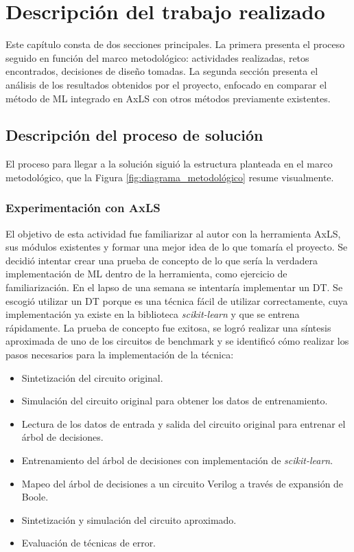 \chapter{Descripción del trabajo realizado}

Este capítulo consta de dos secciones principales. La primera presenta el
proceso seguido en función del marco metodológico: actividades realizadas,
retos encontrados, decisiones de diseño tomadas. La segunda sección presenta el
análisis de los resultados obtenidos por el proyecto, enfocado en comparar el
método de ML integrado en AxLS con otros métodos previamente existentes.

\section{Descripción del proceso de solución}

El proceso para llegar a la solución siguió la estructura planteada en el marco
metodológico, que la Figura \ref{fig:diagrama_metodológico} resume visualmente.

\subsection{Experimentación con AxLS}

El objetivo de esta actividad fue familiarizar al autor con la herramienta
AxLS, sus módulos existentes y formar una mejor idea de lo que tomaría el
proyecto. Se decidió intentar crear una prueba de concepto de lo que sería la
verdadera implementación de ML dentro de la herramienta, como ejercicio de
familiarización.
En el lapso de una semana se intentaría implementar un DT. Se
escogió utilizar un DT porque es una técnica fácil de utilizar correctamente,
cuya implementación ya existe en la biblioteca \emph{scikit-learn} y que se
entrena rápidamente.
La prueba de concepto fue exitosa, se logró realizar una síntesis aproximada de
uno de los circuitos de benchmark y se identificó cómo realizar los pasos
necesarios para la implementación de la técnica:

\begin{itemize}
  \item Sintetización del circuito original.
  \item Simulación del circuito original para obtener los datos de entrenamiento.
  \item Lectura de los datos de entrada y salida del circuito original para
    entrenar el árbol de decisiones.
  \item Entrenamiento del árbol de decisiones con implementación de
    \emph{scikit-learn}.
  \item Mapeo del árbol de decisiones a un circuito Verilog a través de
    expansión de Boole.
  \item Sintetización y simulación del circuito aproximado.
  \item Evaluación de técnicas de error.
\end{itemize}

